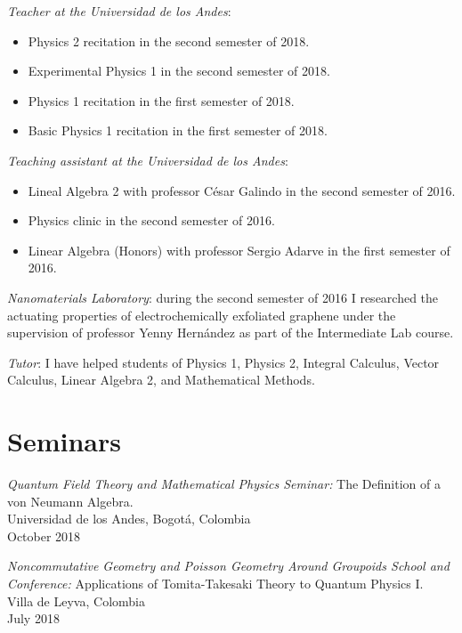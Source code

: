\documentclass[line,margin]{res}
\begin{document}
\begin{resume}
{\sl Teacher at the Universidad de los Andes}:
\begin{itemize}

\item Physics 2 recitation in the second semester of 2018.

\item Experimental Physics 1 in the second semester of 2018.

\item Physics 1 recitation in the first semester of 2018.

\item Basic Physics 1 recitation in the first semester of 2018.

\end{itemize}

{\sl Teaching assistant at the Universidad de los Andes}: 
\begin{itemize}

\item Lineal Algebra 2 with professor César Galindo in the second semester of 2016.

\item Physics clinic in the second semester of 2016.

\item Linear Algebra (Honors) with professor Sergio Adarve in the first semester of 2016.

\end{itemize}

{\sl Nanomaterials Laboratory}: during the second semester of 2016 I researched the actuating properties of electrochemically exfoliated graphene under the supervision of professor Yenny Hernández as part of the Intermediate Lab course.
  
{\sl Tutor}: I have helped students of Physics 1, Physics 2, Integral Calculus, Vector Calculus, Linear Algebra 2, and Mathematical Methods.

\section{Seminars}

{\sl Quantum Field Theory and Mathematical Physics Seminar:} The Definition of a von Neumann Algebra.\\
Universidad de los Andes, Bogotá, Colombia\\
October 2018


{\sl Noncommutative Geometry and Poisson Geometry Around Groupoids School and Conference:} Applications of Tomita-Takesaki Theory to Quantum Physics I.\\
Villa de Leyva, Colombia\\
July 2018


\end{resume}
\end{document}
